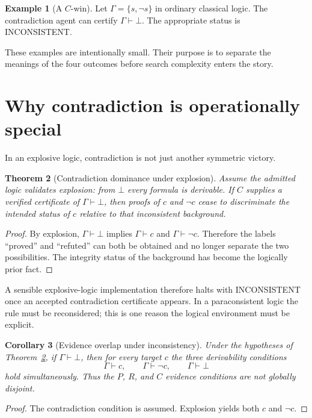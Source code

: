 \documentclass[11pt,openany]{book}
\newtheorem{theorem}{Theorem}[chapter]
\newtheorem{corollary}[theorem]{Corollary}
\theoremstyle{definition}
\newtheorem{example}[theorem]{Example}
\theoremstyle{remark}
\newcommand{\botc}{\bot}
\begin{document}
\begin{example}[A $C$-win]
Let $\Gamma=\{s,\neg s\}$ in ordinary classical logic. The contradiction agent can certify $\Gamma\vdash\botc$. The appropriate status is \textsf{INCONSISTENT}.
\end{example}

These examples are intentionally small. Their purpose is to separate the meanings of the four outcomes before search complexity enters the story.

\section{Why contradiction is operationally special}
In an explosive logic, contradiction is not just another symmetric victory.

\begin{theorem}[Contradiction dominance under explosion]\label{thm:contradiction}
Assume the admitted logic validates explosion: from $\botc$ every formula is derivable. If $C$ supplies a verified certificate of $\Gamma\vdash\botc$, then proofs of $c$ and $\neg c$ cease to discriminate the intended status of $c$ relative to that inconsistent background.
\end{theorem}
\begin{proof}
By explosion, $\Gamma\vdash\botc$ implies $\Gamma\vdash c$ and $\Gamma\vdash\neg c$. Therefore the labels ``proved'' and ``refuted'' can both be obtained and no longer separate the two possibilities. The integrity status of the background has become the logically prior fact.
\end{proof}

A sensible explosive-logic implementation therefore halts with \textsf{INCONSISTENT} once an accepted contradiction certificate appears. In a paraconsistent logic the rule must be reconsidered; this is one reason the logical environment must be explicit.


\begin{corollary}[Evidence overlap under inconsistency]\label{cor:overlap}
Under the hypotheses of Theorem~\ref{thm:contradiction}, if $\Gamma\vdash\botc$, then for every target $c$ the three derivability conditions
\[
\Gamma\vdash c,\qquad \Gamma\vdash\neg c,\qquad \Gamma\vdash\botc
\]
hold simultaneously. Thus the $P$, $R$, and $C$ evidence conditions are not globally disjoint.
\end{corollary}
\begin{proof}
The contradiction condition is assumed. Explosion yields both $c$ and $\neg c$.
\end{proof}
\end{document}
